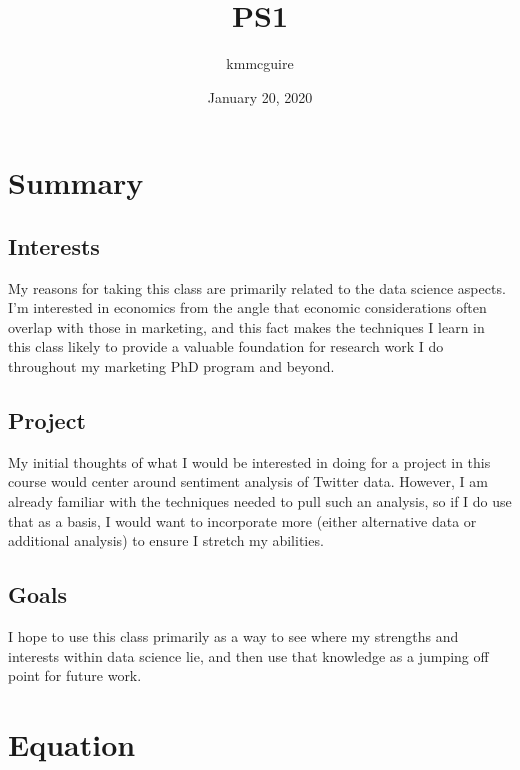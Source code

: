 \documentclass{article}
\title{PS1}
\author{kmmcguire }
\date{January 20, 2020}
\begin{document}
\maketitle

\section{Summary}
\subsection{Interests}
My reasons for taking this class are primarily related to the data science aspects. I'm interested in economics from the angle that economic considerations often overlap with those in marketing, and this fact makes the techniques I learn in this class likely to provide a valuable foundation for research work I do throughout my marketing PhD program and beyond. 
\subsection{Project}
My initial thoughts of what I would be interested in doing for a project in this course would center around sentiment analysis of Twitter data. However, I am already familiar with the techniques needed to pull such an analysis, so if I do use that as a basis, I would want to incorporate more (either alternative data or additional analysis) to ensure I stretch my abilities.
\subsection{Goals}
I hope to use this class primarily as a way to see where my strengths and interests within data science lie, and then use that knowledge as a jumping off point for future work.

\section{Equation}

\end{document}
